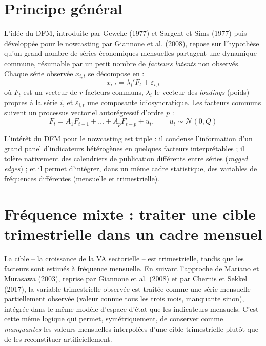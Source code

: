 \documentclass[11pt,a4paper]{report}
\begin{document}
\section{Principe général}

L'idée du DFM, introduite par Geweke (1977) et Sargent et Sims (1977) puis développée pour le nowcasting par Giannone et al. (2008), repose sur l'hypothèse qu'un grand nombre de séries économiques mensuelles partagent une dynamique commune, résumable par un petit nombre de \emph{facteurs latents} non observés. Chaque série observée $x_{i,t}$ se décompose en :
\begin{equation}
  x_{i,t} = \lambda_i' F_t + \varepsilon_{i,t}
  \label{eq:mesure}
\end{equation}
où $F_t$ est un vecteur de $r$ facteurs communs, $\lambda_i$ le vecteur des \emph{loadings} (poids) propres à la série $i$, et $\varepsilon_{i,t}$ une composante idiosyncratique. Les facteurs communs suivent un processus vectoriel autorégressif d'ordre $p$ :
\begin{equation}
  F_t = A_1 F_{t-1} + \dots + A_p F_{t-p} + u_t, \qquad u_t \sim \mathcal{N}(0, Q)
  \label{eq:transition}
\end{equation}

L'intérêt du DFM pour le nowcasting est triple : il condense l'information d'un grand panel d'indicateurs hétérogènes en quelques facteurs interprétables ; il tolère nativement des calendriers de publication différents entre séries (\emph{ragged edges}) ; et il permet d'intégrer, dans un même cadre statistique, des variables de fréquences différentes (mensuelle et trimestrielle).

\section{Fréquence mixte : traiter une cible trimestrielle dans un cadre mensuel}

La cible -- la croissance de la VA sectorielle -- est trimestrielle, tandis que les facteurs sont estimés à fréquence mensuelle. En suivant l'approche de Mariano et Murasawa (2003), reprise par Giannone et al. (2008) et par Chernis et Sekkel (2017), la variable trimestrielle observée est traitée comme une série mensuelle partiellement observée (valeur connue tous les trois mois, manquante sinon), intégrée dans le même modèle d'espace d'état que les indicateurs mensuels. C'est cette même logique qui permet, symétriquement, de conserver comme \emph{manquantes} les valeurs mensuelles interpolées d'une cible trimestrielle plutôt que de les reconstituer artificiellement.
\end{document}

